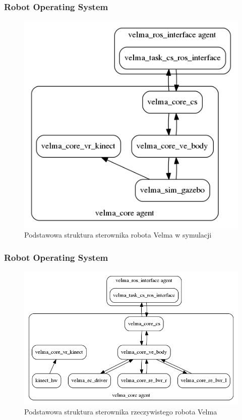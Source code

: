 \begin{frame}
	\frametitle{Robot Operating System}
	\begin{figure}
		\includegraphics[scale=0.4]{./images/system-sim.png}
		\caption{\normalsize{Podstawowa struktura sterownika robota Velma w symulacji}}
	\end{figure}
\end{frame}


\begin{frame}
	\frametitle{Robot Operating System}
	\begin{figure}
		\includegraphics[scale=0.4]{./images/system-hw.png}
		\caption{\normalsize{Podstawowa struktura sterownika rzeczywistego robota Velma}}
	\end{figure}
\end{frame}
	
